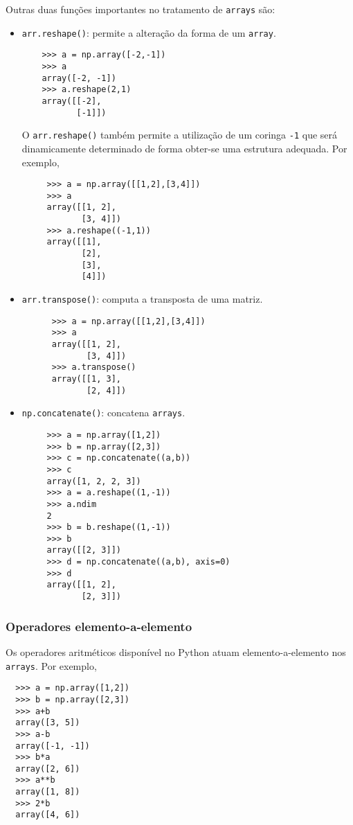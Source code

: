 \documentclass[12pt]{article}
\begin{document}
Outras duas funções importantes no tratamento de \lstinline+arrays+ são:
\begin{itemize}
\item \lstinline+arr.reshape()+: permite a alteração da forma de um \lstinline+array+.
  \begin{lstlisting}
    >>> a = np.array([-2,-1])
    >>> a
    array([-2, -1])
    >>> a.reshape(2,1)
    array([[-2],
           [-1]])
   \end{lstlisting}

   O \lstinline+arr.reshape()+ também permite a utilização de um coringa \lstinline+-1+ que será dinamicamente determinado de forma obter-se uma estrutura adequada. Por exemplo,
   \begin{lstlisting}
     >>> a = np.array([[1,2],[3,4]])
     >>> a
     array([[1, 2],
            [3, 4]])
     >>> a.reshape((-1,1))
     array([[1],
            [2],
            [3],
            [4]])
    \end{lstlisting}
\item \lstinline+arr.transpose()+: computa a transposta de uma matriz.
    \begin{lstlisting}
      >>> a = np.array([[1,2],[3,4]])
      >>> a
      array([[1, 2],
             [3, 4]])
      >>> a.transpose()
      array([[1, 3],
             [2, 4]])
   \end{lstlisting}
 \item \lstinline+np.concatenate()+: concatena \lstinline+arrays+.
   \begin{lstlisting}
     >>> a = np.array([1,2])
     >>> b = np.array([2,3])
     >>> c = np.concatenate((a,b))
     >>> c
     array([1, 2, 2, 3])
     >>> a = a.reshape((1,-1))
     >>> a.ndim
     2
     >>> b = b.reshape((1,-1))
     >>> b
     array([[2, 3]])
     >>> d = np.concatenate((a,b), axis=0)
     >>> d
     array([[1, 2],
            [2, 3]])
   \end{lstlisting}
\end{itemize}

\subsubsection{Operadores elemento-a-elemento}\label{subsubsection:ope-a-e}

Os operadores aritméticos disponível no Python atuam elemento-a-elemento nos \lstinline+arrays+. Por exemplo,
\begin{lstlisting}
  >>> a = np.array([1,2])
  >>> b = np.array([2,3])
  >>> a+b
  array([3, 5])
  >>> a-b
  array([-1, -1])
  >>> b*a
  array([2, 6])
  >>> a**b
  array([1, 8])
  >>> 2*b
  array([4, 6])
\end{lstlisting}
\end{document}
